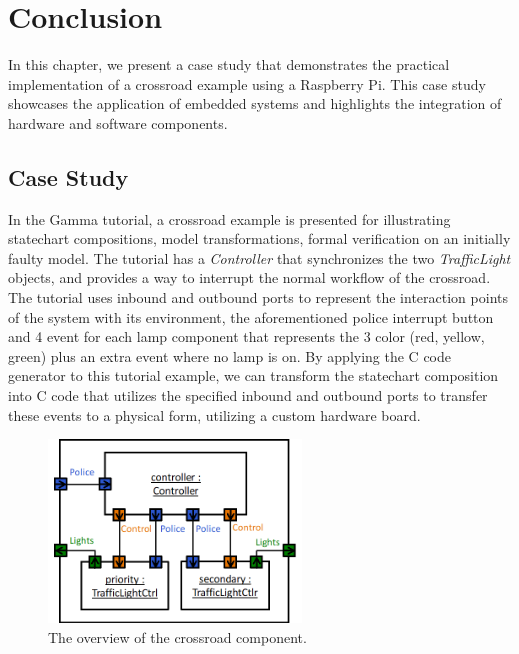 \chapter{Conclusion}

In this chapter, we present a case study that demonstrates the practical implementation of a crossroad example using a Raspberry Pi. This case study showcases the application of embedded systems and highlights the integration of hardware and software components.

\section{Case Study}

In the Gamma tutorial, a crossroad example is presented for illustrating statechart compositions, model transformations, formal verification on an initially faulty model. The tutorial has a \textit{Controller} that synchronizes the two \textit{TrafficLight} objects, and provides a way to interrupt the normal workflow of the crossroad. The tutorial uses inbound and outbound ports to represent the interaction points of the system with its environment, the aforementioned police interrupt button and 4 event for each lamp component that represents the 3 color (red, yellow, green) plus an extra event where no lamp is on. By applying the C code generator to this tutorial example, we can transform the statechart composition into C code that utilizes the specified inbound and outbound ports to transfer these events to a physical form, utilizing a custom hardware board.

\begin{figure}[h]
	\centering
	\includegraphics[width=0.6\textwidth]{images/crossroad-component.png}
	\caption{The overview of the crossroad component.}
	\label{fig:crossroad}
\end{figure}

